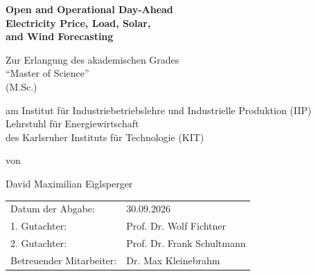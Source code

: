 \documentclass[
  paper=a4,
  fontsize=10pt,
  toc=bib,
  titlepage=firstiscover,
  headings=big
]{scrartcl}
\theoremstyle{definition}
\begin{document}

\onehalfspacing

\hypersetup{pageanchor=false}
\begin{titlepage}
\thispagestyle{empty}
\begin{center}

{\LARGE\bfseries
Open and Operational Day-Ahead\\
Electricity Price, Load, Solar,\\
and Wind Forecasting
\par}

\vspace{2.6cm}

{\large
Zur Erlangung des akademischen Grades\\
``Master of Science''\\
(M.Sc.)
\par}

\vspace{1.0cm}

{\large
am Institut f\"ur Industriebetriebslehre und Industrielle Produktion (IIP)\\
Lehrstuhl f\"ur Energiewirtschaft\\
des Karlsruher Instituts f\"ur Technologie (KIT)
\par}

\vfill

{\large
von
\par}

\vspace{0.25cm}

{\Large
David Maximilian Eiglsperger
\par}

\vfill

\begin{tabular}{@{}ll@{}}
Datum der Abgabe: & 30.09.2026 \\
1. Gutachter: & Prof. Dr. Wolf Fichtner \\
2. Gutachter: & Prof. Dr. Frank Schultmann \\
Betreuender Mitarbeiter: & Dr. Max Kleinebrahm \\
\end{tabular}

\end{center}
\end{titlepage}
\hypersetup{pageanchor=true}
\end{document}
